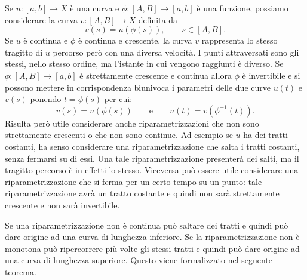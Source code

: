 Se $u\colon [a,b] \to X$ è una curva e $\phi\colon [A,B] \to [a,b]$ è una funzione, 
possiamo considerare la curva $v\colon [A,B] \to X$ definita da
\[
  v(s) = u(\phi(s)), \qquad s\in [A,B].
\]
Se $u$ è continua e $\phi$ è continua e crescente, la curva $v$ rappresenta 
lo stesso tragitto di $u$ percorso però con una diversa velocità. 
I punti attraversati sono gli stessi, nello stesso ordine, ma l'istante in cui 
vengono raggiunti è diverso.
Se $\phi:[A,B] \to [a,b]$ è strettamente crescente e continua
allora $\phi$ è invertibile e si possono mettere in corrispondenza biunivoca 
i parametri delle due curve $u(t)$ e $v(s)$ ponendo $t=\phi(s)$ per cui:
\[
  v(s) = u(\phi(s)) \qquad \text{e} \qquad u(t) = v(\phi^{-1}(t)).
\]
Risulta però utile considerare anche riparametrizzazioni che non sono 
strettamente crescenti o che non sono continue.
Ad esempio se $u$ ha dei tratti costanti, ha senso considerare una riparametrizzazione 
che salta i tratti costanti, senza fermarsi su di essi. 
Una tale riparametrizzazione presenterà dei salti, 
ma il tragitto percorso è in effetti lo stesso. 
Viceversa può essere utile considerare una riparametrizzazione che si ferma 
per un certo tempo su un punto: tale riparametrizzazione avrà un tratto costante 
e quindi non sarà strettamente crescente e non sarà invertibile.

Se una riparametrizzazione non è continua può saltare dei tratti 
e quindi può dare origine ad una curva di lunghezza inferiore.
Se la riparametrizzazione non è monotona può ripercorrere 
più volte gli stessi tratti e quindi può dare origine ad una curva di lunghezza 
superiore. Questo viene formalizzato nel seguente teorema. 

